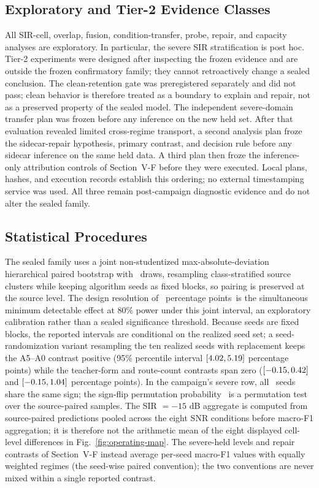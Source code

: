 \documentclass[letterpaper,journal]{IEEEtran}
\newcommand{\pp}{percentage points}
\begin{document}
\subsection{Exploratory and Tier-2 Evidence Classes}
All SIR-cell, overlap, fusion, condition-transfer, probe, repair, and
capacity analyses are exploratory. In particular, the severe SIR
stratification is post hoc. Tier-2 experiments were designed after inspecting
the frozen evidence and are outside the frozen confirmatory family; they cannot
retroactively change a sealed conclusion. The clean-retention gate was
preregistered separately and did not pass; clean behavior is therefore treated
as a boundary to explain and repair, not as a preserved property of the sealed
model.
The independent severe-domain transfer plan was frozen before any inference on
the new held set. After that evaluation revealed limited cross-regime
transport, a second analysis plan froze the sidecar-repair hypothesis, primary
contrast, and decision rule before any sidecar inference on the same held data.
A third plan then froze the inference-only attribution controls of
Section~V-F before they were executed. Local plans, hashes, and execution
records establish this ordering; no external timestamping service was used.
All three remain post-campaign diagnostic evidence and do not alter the sealed
family.

\subsection{Statistical Procedures}
The sealed family uses a joint non-studentized max-absolute-deviation
hierarchical paired bootstrap with \ProtocolBootstrapDraws\ draws, resampling
class-stratified source clusters while keeping algorithm seeds as fixed
blocks, so pairing is preserved at the source level. The design resolution of
\DesignResolution\ \pp\ is the simultaneous minimum detectable effect at 80\%
power under this joint interval, an exploratory calibration rather than a
sealed significance threshold. Because seeds are fixed blocks, the reported
intervals are conditional on the realized seed set; a seed-randomization
variant resampling the ten realized seeds with replacement keeps the A5--A0
contrast positive (95\% percentile interval
$[4.02,5.19]$ \pp) while the teacher-form and
route-count contrasts span zero
($[-0.15,0.42]$ and
$[-0.15,1.04]$ \pp). In the campaign's severe row, all
\SevereGainIqformerPositiveSeeds\ seeds share the same sign; the sign-flip
permutation probability \SevereGainIqformerSignFlipP\ is a permutation test
over the source-paired samples. The SIR $=-15$ dB aggregate is computed from
source-paired predictions pooled across the eight SNR conditions before
macro-F1 aggregation; it is therefore not the arithmetic mean of the eight
displayed cell-level differences in Fig.~\ref{fig:operating-map}. The
severe-held levels and repair contrasts of Section~V-F instead average
per-seed macro-F1 values with equally weighted regimes (the seed-wise paired
convention); the two conventions are never mixed within a single reported
contrast.
\end{document}
